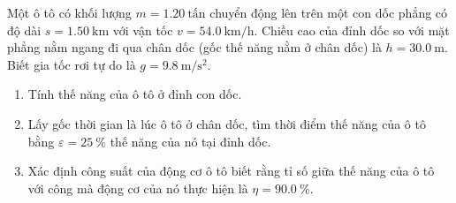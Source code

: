 	\begin{ex}
		Một ô tô có khối lượng $m=\SI{1.20}{\text{tấn}}$ chuyển động lên trên một con dốc phẳng có độ dài $s=\SI{1.50}{\kilo\meter}$ với vận tốc $v=\SI{54.0}{\kilo\meter/\hour}$. Chiều cao của đỉnh dốc so với mặt phẳng nằm ngang đi qua chân dốc (gốc thế năng nằm ở chân dốc) là $h=\SI{30.0}{\meter}$.
		Biết gia tốc rơi tự do là $g=\SI{9.8}{\meter/\second^2}$.
		\begin{enumerate}[label=\alph*)]
			\item Tính thế năng của ô tô ở đỉnh con dốc.
			\item Lấy gốc thời gian là lúc ô tô ở chân dốc, tìm thời điểm thế năng của ô tô bằng $\varepsilon=\SI{25}{\percent}$ thế năng của nó tại đỉnh dốc.
			\item Xác định công suất của động cơ ô tô biết rằng tỉ số giữa thế năng của ô tô với công mà động cơ của nó thực hiện là $\eta=\SI{90.0}{\percent}$.
		\end{enumerate}
	\end{ex}

